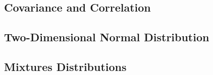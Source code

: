 \renewcommand{\arraystretch}{1}
\setlength\tabcolsep{\oldtabcolsep}

\subsection{Covariance and Correlation}

\subsection{Two-Dimensional Normal Distribution}

\subsection{Mixtures Distributions}